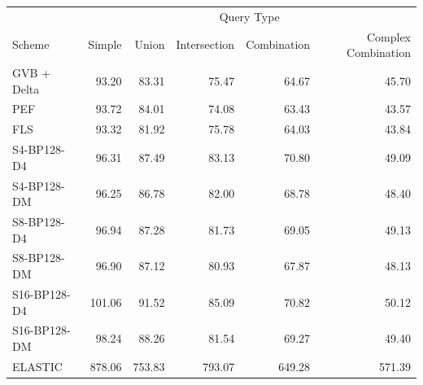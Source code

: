 \begin{tabular}{lrrrrr}
\toprule
 & \multicolumn{5}{c}{Query Type} \\
Scheme & Simple & Union & Intersection & Combination & Complex Combination \\
\midrule
GVB + Delta & 93.20 & 83.31 & 75.47 & 64.67 & 45.70 \\
PEF & 93.72 & 84.01 & 74.08 & 63.43 & 43.57 \\
FLS & 93.32 & 81.92 & 75.78 & 64.03 & 43.84 \\
S4-BP128-D4 & 96.31 & 87.49 & 83.13 & 70.80 & 49.09 \\
S4-BP128-DM & 96.25 & 86.78 & 82.00 & 68.78 & 48.40 \\
S8-BP128-D4 & 96.94 & 87.28 & 81.73 & 69.05 & 49.13 \\
S8-BP128-DM & 96.90 & 87.12 & 80.93 & 67.87 & 48.13 \\
S16-BP128-D4 & 101.06 & 91.52 & 85.09 & 70.82 & 50.12 \\
S16-BP128-DM & 98.24 & 88.26 & 81.54 & 69.27 & 49.40 \\
ELASTIC & 878.06 & 753.83 & 793.07 & 649.28 & 571.39 \\
\bottomrule
\end{tabular}
